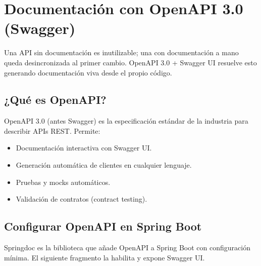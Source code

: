 \section{Documentación con OpenAPI 3.0 (Swagger)}

Una API sin documentación es inutilizable; una con
documentación a mano queda desincronizada al primer cambio.
OpenAPI 3.0 + Swagger UI resuelve esto generando documentación viva
desde el propio código.


\subsection{¿Qué es OpenAPI?}

OpenAPI 3.0 (antes Swagger) es la especificación estándar de la
industria para describir APIs REST. Permite:

\begin{itemize}
\item Documentación interactiva con Swagger UI.
\item Generación automática de clientes en cualquier lenguaje.
\item Pruebas y mocks automáticos.
\item Validación de contratos (contract testing).
\end{itemize}

\subsection{Configurar OpenAPI en Spring Boot}

Springdoc es la biblioteca que añade OpenAPI a Spring Boot
con configuración mínima. El siguiente fragmento la habilita y
expone Swagger UI.



